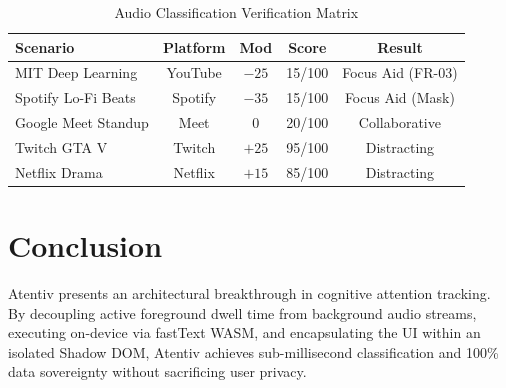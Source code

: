 \documentclass[conference]{IEEEtran}
\begin{document}
\begin{table}[h]
\caption{Audio Classification Verification Matrix}
\centering
\begin{tabular}{lcccc}
\toprule
Scenario & Platform & Mod & Score & Result \\
\midrule
MIT Deep Learning & YouTube & $-25$ & 15/100 & Focus Aid (FR-03) \\
Spotify Lo-Fi Beats & Spotify & $-35$ & 15/100 & Focus Aid (Mask) \\
Google Meet Standup & Meet & $0$ & 20/100 & Collaborative \\
Twitch GTA V & Twitch & $+25$ & 95/100 & Distracting \\
Netflix Drama & Netflix & $+15$ & 85/100 & Distracting \\
\bottomrule
\end{tabular}
\end{table}

\section{Conclusion}
Atentiv presents an architectural breakthrough in cognitive attention tracking. By decoupling active foreground dwell time from background audio streams, executing on-device via fastText WASM, and encapsulating the UI within an isolated Shadow DOM, Atentiv achieves sub-millisecond classification and 100\% data sovereignty without sacrificing user privacy.
\end{document}
